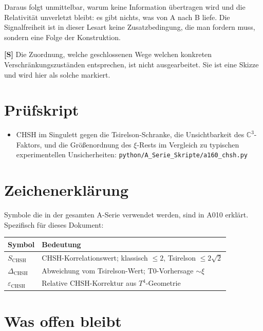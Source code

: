 Daraus folgt unmittelbar, warum keine Information übertragen wird und die
Relativität unverletzt bleibt: es gibt nichts, was von A nach B liefe. Die
Signalfreiheit ist in dieser Lesart keine Zusatzbedingung, die man fordern muss,
sondern eine Folge der Konstruktion.

\textbf{[S]} Die Zuordnung, welche geschlossenen Wege welchen konkreten
Verschränkungszuständen entsprechen, ist nicht ausgearbeitet. Sie ist eine
Skizze und wird hier als solche markiert.

\section{Prüfskript}

\begin{itemize}
  \item CHSH im Singulett gegen die Tsirelson-Schranke, die Unsichtbarkeit des
    $\mathbb{C}^3$-Faktors, und die Größenordnung des $\xi$-Rests im
    Vergleich zu typischen experimentellen Unsicherheiten:
    \texttt{python/A\_Serie\_Skripte/a160\_chsh.py}
\end{itemize}


\section{Zeichenerklärung}

Symbole die in der gesamten A-Serie verwendet werden, sind in A010 erklärt.
Spezifisch für dieses Dokument:

\begin{center}
\renewcommand{\arraystretch}{1.3}
{\small\begin{tabular}{lp{9cm}}
\toprule
Symbol & Bedeutung \\
\midrule
$S_\text{CHSH}$ & CHSH-Korrelationswert; klassisch $\leq2$, Tsirelson $\leq2\sqrt2$ \\
$\Delta_\text{CHSH}$ & Abweichung vom Tsirelson-Wert; T0-Vorhersage $\sim\xi$ \\
$\varepsilon_\text{CHSH}$ & Relative CHSH-Korrektur aus $T^4$-Geometrie \\
\bottomrule
\end{tabular}}
\renewcommand{\arraystretch}{1.0}
\end{center}

\section{Was offen bleibt}

